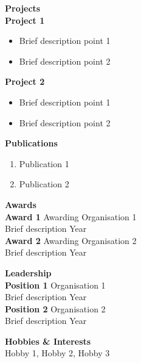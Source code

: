 \documentclass[a4paper]{article}
\newcommand{\header} [1] {
    {\hspace*{-18pt}\vspace*{6pt} {\color{CarnationPink}\large{\textbf{#1}}}}\\
}
\begin{document}
\header{Projects}
\vspace{1mm}
\textbf{Project 1}\\
\vspace{-1mm}
\begin{itemize} \itemsep -2pt
	\item Brief description point 1
	\item Brief description point 2
\end{itemize}
\vspace{1mm}
\textbf{Project 2}\\
\vspace{-1mm}
\begin{itemize} \itemsep -2pt
	\item Brief description point 1
	\item Brief description point 2
\end{itemize}
\vspace{1mm}

\header{Publications}
\begin{enumerate} \itemsep -2pt
    \item Publication 1
    \item Publication 2
\end{enumerate}
\vspace*{2mm}

\header{Awards}
\textbf{Award 1} \hfill Awarding Organisation 1\\
Brief description \hfill Year\\
\vspace*{2mm}
\textbf{Award 2} \hfill Awarding Organisation 2\\
Brief description \hfill Year\\
\vspace*{2mm}

\header{Leadership}
\textbf{Position 1} \hfill Organisation 1\\
Brief description \hfill Year\\
\vspace*{2mm}
\textbf{Position 2} \hfill Organisation 2\\
Brief description \hfill Year\\
\vspace*{2mm}
 
\header{Hobbies \& Interests}
Hobby 1, Hobby 2, Hobby 3
\end{document}
